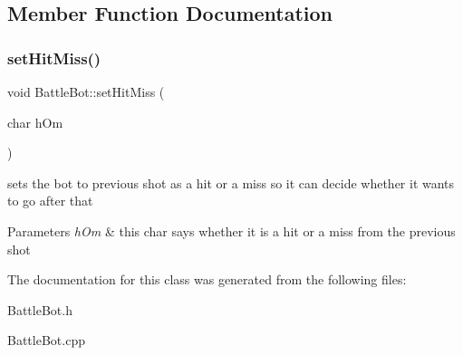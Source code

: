 \subsection{Member Function Documentation}
\mbox{\label{classBattleBot_ae604c63e69028ae8c7e26008d3c7d6fc}} 
\subsubsection{\texorpdfstring{set\+Hit\+Miss()}{setHitMiss()}}
{\footnotesize\ttfamily void Battle\+Bot\+::set\+Hit\+Miss (\begin{DoxyParamCaption}\item[{char}]{h\+Om }\end{DoxyParamCaption})}

sets the bot to previous shot as a hit or a miss so it can decide whether it wants to go after that 
\begin{DoxyParams}{Parameters}
{\em h\+Om} & this char says whether it is a hit or a miss from the previous shot \\
\hline
\end{DoxyParams}


The documentation for this class was generated from the following files\+:\begin{DoxyCompactItemize}
\item 
Battle\+Bot.\+h\item 
Battle\+Bot.\+cpp\end{DoxyCompactItemize}
